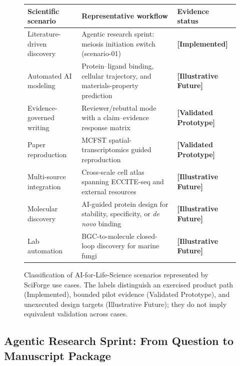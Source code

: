 \documentclass[sn-basic,Numbered,pdflatex]{sn-jnl}
\begin{document}
\begin{figure}[ht!]
\centering
\caption{Classification of AI-for-Life-Science scenarios represented by SciForge use cases. The labels distinguish an exercised product path (Implemented), bounded pilot evidence (Validated Prototype), and unexecuted design targets (Illustrative Future); they do not imply equivalent validation across cases.}
\label{fig:use-case-classification}
\scriptsize
\setlength{\tabcolsep}{3pt}
\renewcommand{\arraystretch}{1.12}
\begin{tabular}{@{}L{0.25\textwidth} L{0.48\textwidth} L{0.21\textwidth}@{}}
\toprule
\textbf{Scientific scenario} & \textbf{Representative workflow} & \textbf{Evidence status} \\
\midrule
Literature-driven discovery & Agentic research sprint: meiosis initiation switch (scenario-01) & \textbf{[Implemented]} \\
Automated AI modeling & Protein--ligand binding, cellular trajectory, and materials-property prediction & \textbf{[Illustrative Future]} \\
Evidence-governed writing & Reviewer/rebuttal mode with a claim--evidence response matrix & \textbf{[Validated Prototype]} \\
Paper reproduction & MCFST spatial-transcriptomics guided reproduction & \textbf{[Validated Prototype]} \\
Multi-source integration & Cross-scale cell atlas spanning ECCITE-seq and external resources & \textbf{[Illustrative Future]} \\
Molecular discovery & AI-guided protein design for stability, specificity, or \emph{de novo} binding & \textbf{[Illustrative Future]} \\
Lab automation & BGC-to-molecule closed-loop discovery for marine fungi & \textbf{[Illustrative Future]} \\
\bottomrule
\end{tabular}
\end{figure}


\subsection{Agentic Research Sprint: From Question to Manuscript Package}
\end{document}
